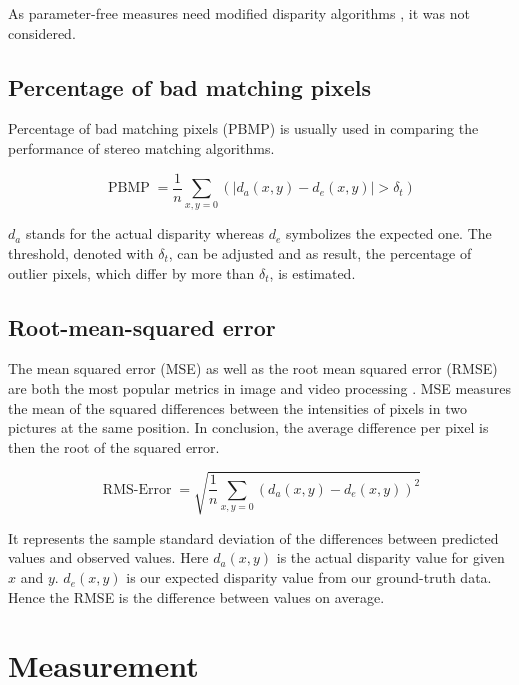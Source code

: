 \noindent As parameter-free measures need modified disparity algorithms \citep{cyganek2011introduction}, it was not considered.

\subsection*{Percentage of bad matching pixels}

Percentage of bad matching pixels (PBMP) is usually used in comparing the performance of stereo matching algorithms.

\begin{equation}
  \operatorname{PBMP}=\frac{1}{n} \sum_{x,y=0}^{}(|d_a(x,y) - d_e(x,y)| > \delta_t)
\end{equation}

\noindent $d_a$ stands for the actual disparity whereas $d_e$ symbolizes the expected one.
The threshold, denoted with $\delta_t$, can be adjusted and as result, the percentage of outlier pixels, which differ by more than $\delta_t$, is estimated.

\subsection*{Root-mean-squared error}

The mean squared error (MSE) as well as the root mean squared error (RMSE) are both the most popular metrics in image and video processing \citep{cyganek2011introduction, benoit2008quality, scharstein2002taxonomy}.
MSE measures the mean of the squared differences between the intensities of pixels in two pictures at the same position.
In conclusion, the average difference per pixel is then the root of the squared error.

\begin{equation}
  \operatorname{RMS-Error}=\sqrt{\frac{1}{n} \sum_{x,y=0}^{}(d_a(x,y) - d_e(x,y))^2}
\end{equation}

\noindent It represents the sample standard deviation of the differences between predicted values and observed values.
Here $d_a(x,y)$ is the actual disparity value for given $x$ and $y$.
$d_e(x,y)$ is our expected disparity value from our ground-truth data.
Hence the RMSE is the difference between values on average.

\section{Measurement}

